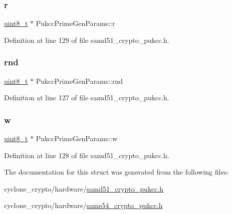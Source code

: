 \mbox{\label{structPukccPrimeGenParams_a48bb9e985196000ee5acb3dcaf7ab010}} 
\subsubsection{\texorpdfstring{r}{r}}
{\footnotesize\ttfamily \hyperlink{stdint_8h_aba7bc1797add20fe3efdf37ced1182c5}{uint8\+\_\+t} $\ast$ Pukcc\+Prime\+Gen\+Params\+::r}



Definition at line 129 of file samd51\+\_\+crypto\+\_\+pukcc.\+h.

\mbox{\label{structPukccPrimeGenParams_a6fae7226854fe95cfb51611b60d55b60}} 
\subsubsection{\texorpdfstring{rnd}{rnd}}
{\footnotesize\ttfamily \hyperlink{stdint_8h_aba7bc1797add20fe3efdf37ced1182c5}{uint8\+\_\+t} $\ast$ Pukcc\+Prime\+Gen\+Params\+::rnd}



Definition at line 127 of file samd51\+\_\+crypto\+\_\+pukcc.\+h.

\mbox{\label{structPukccPrimeGenParams_adb6b7cd3d710131ee8ad2d5aada6be09}} 
\subsubsection{\texorpdfstring{w}{w}}
{\footnotesize\ttfamily \hyperlink{stdint_8h_aba7bc1797add20fe3efdf37ced1182c5}{uint8\+\_\+t} $\ast$ Pukcc\+Prime\+Gen\+Params\+::w}



Definition at line 128 of file samd51\+\_\+crypto\+\_\+pukcc.\+h.



The documentation for this struct was generated from the following files\+:\begin{DoxyCompactItemize}
\item 
cyclone\+\_\+crypto/hardware/\hyperlink{samd51__crypto__pukcc_8h}{samd51\+\_\+crypto\+\_\+pukcc.\+h}\item 
cyclone\+\_\+crypto/hardware/\hyperlink{same54__crypto__pukcc_8h}{same54\+\_\+crypto\+\_\+pukcc.\+h}\end{DoxyCompactItemize}
